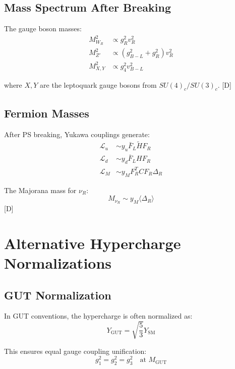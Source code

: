 \documentclass[11pt,a4paper]{article}
\newcommand{\tagD}{\textcolor{blue!70!black}{[D]}}
\begin{document}
\subsection{Mass Spectrum After Breaking}

The gauge boson masses:
\begin{align}
\label{eq:W-R-mass}
M_{W_R}^2 &\propto g_R^2 v_R^2 \\
\label{eq:Z-prime-mass}
M_{Z'}^2 &\propto (g_{B-L}^2 + g_R^2) v_R^2 \\
\label{eq:X-Y-mass}
M_{X,Y}^2 &\propto g_4^2 v_{B-L}^2
\end{align}

where $X, Y$ are the leptoquark gauge bosons from $SU(4)_c / SU(3)_c$.
\tagD

\subsection{Fermion Masses}

After PS breaking, Yukawa couplings generate:
\begin{align}
\label{eq:yukawa-up}
\mathcal{L}_u &\sim y_u \bar{F}_L \tilde{H} F_R \\
\label{eq:yukawa-down}
\mathcal{L}_d &\sim y_d \bar{F}_L H F_R \\
\label{eq:yukawa-majorana}
\mathcal{L}_M &\sim y_M F_R^T C F_R \Delta_R
\end{align}

The Majorana mass for $\nu_R$:
\begin{equation}
\label{eq:majorana-mass}
M_{\nu_R} \sim y_M \langle\Delta_R\rangle
\end{equation}
\tagD

\section{Alternative Hypercharge Normalizations}
\label{app:Y-norm}

\subsection{GUT Normalization}

In GUT conventions, the hypercharge is often normalized as:
\begin{equation}
\label{eq:Y-gut}
Y_{\text{GUT}} = \sqrt{\frac{5}{3}} Y_{\text{SM}}
\end{equation}

This ensures equal gauge coupling unification:
\begin{equation}
\label{eq:gut-unif}
g_1^2 = g_2^2 = g_3^2 \quad \text{at } M_{\text{GUT}}
\end{equation}
\end{document}
